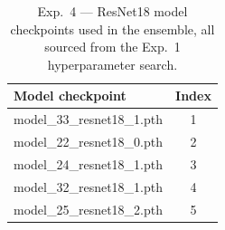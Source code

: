 \begin{table}[H]
\centering
\caption{Exp.\ 4 --- ResNet18 model checkpoints used in the ensemble, all sourced from the Exp.\ 1 hyperparameter search.}
\label{tab:exp4_models}
\small
\begin{tabular}{lc}
\toprule
\textbf{Model checkpoint} & \textbf{Index} \\
\midrule
model_33_resnet18_1.pth & 1 \\
model_22_resnet18_0.pth & 2 \\
model_24_resnet18_1.pth & 3 \\
model_32_resnet18_1.pth & 4 \\
model_25_resnet18_2.pth & 5 \\
\bottomrule
\end{tabular}
\end{table}
